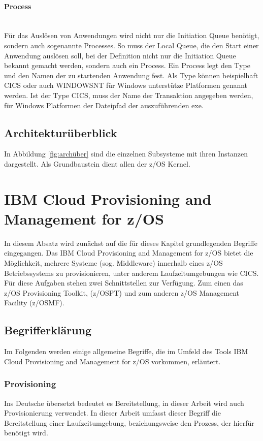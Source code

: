 \paragraph{Process}~\\
Für das Auslösen von Anwendungen wird nicht nur die Initiation Queue benötigt, sondern auch sogenannte \glqq Processes\grqq.
So muss der Local Queue, die den Start einer Anwendung auslösen soll, bei der Definition nicht nur die Initiation Queue bekannt gemacht werden, sondern auch ein Process.
Ein Process legt den \glqq Type\grqq{} und den Namen der zu startenden Anwendung fest.
Als \glqq Type\grqq{} können beispielhaft CICS oder auch WINDOWSNT für Windows unterstütze Platformen genannt werden.
Ist der \glqq Type\grqq{} CICS,  muss der Name der Transaktion angegeben werden, für Windows Platformen der Dateipfad der auszuführenden exe.
\cite{Aranha.2013}

\subsection{Architekturüberblick}
In Abbildung \ref{fig:archüber} sind die einzelnen Subsysteme mit ihren Instanzen dargestellt.
Als Grundbaustein dient allen der z/OS Kernel.

\section{IBM Cloud Provisioning and Management for z/OS}\label{sec:zosmf}
In diesem Absatz wird zunächst auf die für dieses Kapitel grundlegenden Begriffe eingegangen.
Das IBM Cloud Provisioning and Management for z/OS bietet die Möglichkeit, mehrere Systeme (sog. Middleware) innerhalb eines z/OS Betriebssystems zu provisionieren, unter anderem Laufzeitumgebungen wie CICS. 
Für diese Aufgaben stehen zwei Schnittstellen zur Verfügung.
Zum einen das z/OS Provisioning Toolkit, (z/OSPT) und zum anderen z/OS Management Facility (z/OSMF).
\cite{KeithWinnardGaryPuchkoffHirenShah.2016}

\subsection{Begrifferklärung}
Im Folgenden werden einige allgemeine Begriffe, die im Umfeld des Tools \glqq IBM Cloud Provisioning and Management for z/OS\grqq{} vorkommen, erläutert.

\subsubsection{Provisioning}
Ins Deutsche übersetzt bedeutet es Bereitstellung, in dieser Arbeit wird auch Provisionierung verwendet.
In dieser Arbeit umfasst dieser Begriff die Bereitstellung einer Laufzeitumgebung, beziehungsweise den Prozess, der hierfür benötigt wird.

